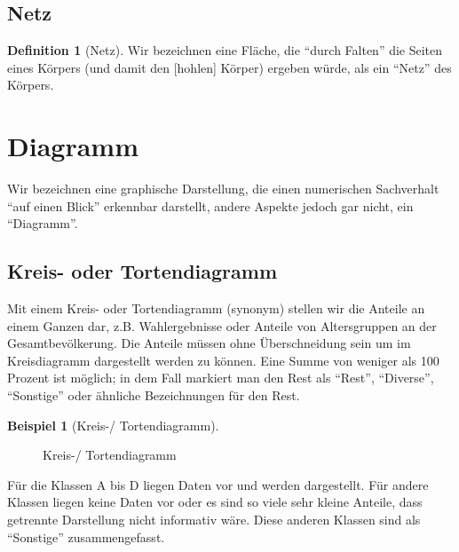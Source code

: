 \documentclass[a4paper]{book}%
\newcommand{\slice}[4]{
  \pgfmathparse{0.5*#1+0.5*#2}
  \let\midangle\pgfmathresult

  \draw[thick,fill=black!10] (0,0) -- (#1:1) arc (#1:#2:1) -- cycle;

  \node[label=\midangle:#4] at (\midangle:1) {};

  \pgfmathparse{min((#2-#1-10)/110*(-0.3),0)}
  \let\temp\pgfmathresult
  \pgfmathparse{max(\temp,-0.5) + 0.8}
  \let\innerpos\pgfmathresult
  \node at (\midangle:\innerpos) {#3};
}
\theoremstyle{definition}
\newtheorem{definition}{Definition}
\newtheorem{beispiel}{Beispiel}
\begin{document}
\subsection{Netz}\label{Netz}

\begin{definition}[Netz]
    Wir bezeichnen eine Fläche, die \enquote{durch Falten} die Seiten eines Körpers (und damit den [hohlen] Körper) ergeben würde, als ein \enquote{Netz} des Körpers.
\end{definition}


\section{Diagramm}

Wir bezeichnen eine graphische Darstellung, die einen numerischen Sachverhalt \enquote{auf einen Blick} erkennbar darstellt, andere Aspekte jedoch gar nicht, ein \enquote{Diagramm}.

\subsection{Kreis- oder Tortendiagramm}

Mit einem Kreis- oder Tortendiagramm (synonym) stellen wir die Anteile an einem Ganzen dar, z.B. Wahlergebnisse oder Anteile von Altersgruppen an der Gesamtbevölkerung. Die Anteile müssen ohne Überschneidung sein um im Kreisdiagramm dargestellt werden zu können. Eine Summe von weniger als 100 Prozent ist möglich; in dem Fall markiert man den Rest als \enquote{Rest}, \enquote{Diverse}, \enquote{Sonstige} oder ähnliche Bezeichnungen für den Rest.

\begin{beispiel}[Kreis-/ Tortendiagramm]\label{bsp:Kreisdiagramm01}
    \begin{figure}
      \centering
      \caption{Kreis-/ Tortendiagramm}\label{fig:Kreisdiagramm01}
    \end{figure}

    Für die Klassen A bis D liegen Daten vor und werden dargestellt. Für andere Klassen liegen keine Daten vor oder es sind so viele sehr kleine Anteile, dass getrennte Darstellung nicht informativ wäre. Diese anderen Klassen sind als \enquote{Sonstige} zusammengefasst.
\end{beispiel}
\end{document}
